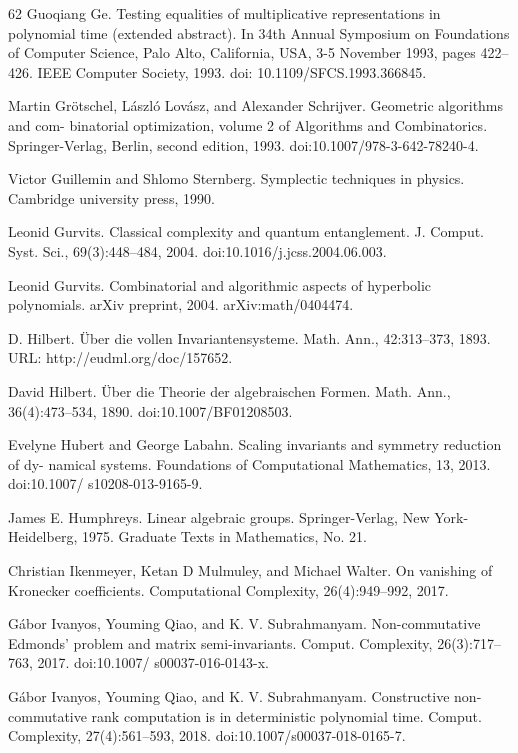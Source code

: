 \begin{thebibliography}{62}
Guoqiang Ge. Testing equalities of multiplicative representations in polynomial time (extended abstract). In 34th Annual Symposium on Foundations of Computer Science, Palo Alto, California, USA, 3-5 November 1993, pages 422–426. IEEE Computer Society, 1993. doi: 10.1109/SFCS.1993.366845.

Martin Grötschel, László Lovász, and Alexander Schrijver. Geometric algorithms and com- binatorial optimization, volume 2 of Algorithms and Combinatorics. Springer-Verlag, Berlin, second edition, 1993. doi:10.1007/978-3-642-78240-4.

Victor Guillemin and Shlomo Sternberg. Symplectic techniques in physics. Cambridge university press, 1990.

Leonid Gurvits. Classical complexity and quantum entanglement. J. Comput. Syst. Sci., 69(3):448–484, 2004. doi:10.1016/j.jcss.2004.06.003.

Leonid Gurvits. Combinatorial and algorithmic aspects of hyperbolic polynomials. arXiv preprint, 2004. arXiv:math/0404474.

D. Hilbert. Über die vollen Invariantensysteme. Math. Ann., 42:313–373, 1893. URL: http://eudml.org/doc/157652.

David Hilbert. Über die Theorie der algebraischen Formen. Math. Ann., 36(4):473–534, 1890. doi:10.1007/BF01208503.

Evelyne Hubert and George Labahn. Scaling invariants and symmetry reduction of dy- namical systems. Foundations of Computational Mathematics, 13, 2013. doi:10.1007/ s10208-013-9165-9.

James E. Humphreys. Linear algebraic groups. Springer-Verlag, New York-Heidelberg, 1975. Graduate Texts in Mathematics, No. 21.

Christian Ikenmeyer, Ketan D Mulmuley, and Michael Walter. On vanishing of Kronecker coefficients. Computational Complexity, 26(4):949–992, 2017.

Gábor Ivanyos, Youming Qiao, and K. V. Subrahmanyam. Non-commutative Edmonds’ problem and matrix semi-invariants. Comput. Complexity, 26(3):717–763, 2017. doi:10.1007/ s00037-016-0143-x.

Gábor Ivanyos, Youming Qiao, and K. V. Subrahmanyam. Constructive non-commutative rank computation is in deterministic polynomial time. Comput. Complexity, 27(4):561–593, 2018. doi:10.1007/s00037-018-0165-7.


\end{thebibliography}
